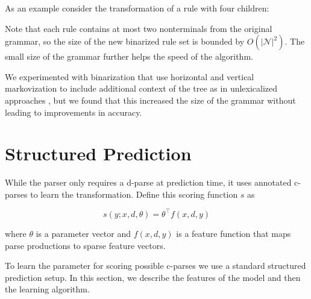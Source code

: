 \documentclass[11pt,letterpaper]{article}
\newcommand{\nonterms}{\mathcal{N}}
\newcommand{\lpkcomment}[1]{\textcolor{red}{\bf \small [#1 --lpk]}}
\begin{document}
\noindent As an example consider the transformation of a rule with four children:

\begin{center}
\end{center}

Note that each rule contains at most two nonterminals from the original grammar, so the size of the new binarized rule set is bounded by $O(|\nonterms|^2)$. The small size of the grammar further helps the speed of the algorithm.

We experimented with binarization that use horizontal and vertical markovization to include additional context 
of the tree as in unlexicalized approaches \cite{klein2003accurate}, but we found that this increased the size of the grammar without leading to improvements in accuracy.






\section{Structured Prediction}
\label{sec:strpred}
While the parser only requires a d-parse at prediction time, 
it uses annotated c-parses to learn the transformation. 
Define this scoring function $s$ as 

\[s(y;x, d, \theta) =  \theta^{\top} f(x, d, y) \]

\noindent
where $\theta$ is a parameter vector and $f(x, d, y)$ is a feature
function that maps parse productions to sparse feature vectors. 

To learn the parameter for scoring possible c-parses we use a standard
structured prediction setup. In this section, we describe the features
of the model and then the learning algorithm.

\end{document}
